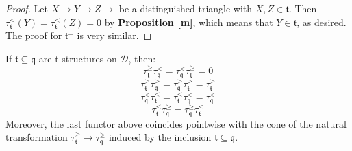 \begin{proof}
Let $X \longrightarrow Y \longrightarrow Z \longrightarrow$ be a distinguished triangle with $X,Z \in \mathfrak{t}$. Then $\tau^<_{\mathfrak{t}}(Y)=\tau^<_{\mathfrak{t}}(Z)=0$ by \hyperref[m]{\textbf{Proposition \ref*{m}}}, which means that $Y \in \mathfrak{t}$, as desired. The proof for $\mathfrak{t}^{\perp}$ is very similar. 
\end{proof}

\begin{prop}\label{l}
If $\mathfrak{t} \subseteq \mathfrak{q}$ are t-structures on $\mathscr{D}$, then: $$\tau^{\ge}_{\mathfrak{t}}\tau^<_{\mathfrak{q}}=\tau^<_{\mathfrak{q}}\tau^{\ge}_{\mathfrak{t}}=0$$ $$\tau^{\ge}_{\mathfrak{t}}\tau^{\ge}_{\mathfrak{q}}=\tau^{\ge}_{\mathfrak{q}}\tau^{\ge}_{\mathfrak{t}}=\tau^{\ge}_{\mathfrak{t}}$$ $$\tau^<_{\mathfrak{q}}\tau^<_{\mathfrak{t}}=\tau^<_{\mathfrak{t}}\tau^<_{\mathfrak{q}}=\tau^<_{\mathfrak{q}}$$ $$\tau^<_{\mathfrak{t}}\tau^{\ge}_{\mathfrak{q}}=\tau^{\ge}_{\mathfrak{q}}\tau^<_{\mathfrak{t}}$$
Moreover, the last functor above coincides pointwise with the cone of  the natural transformation $\tau^{\ge}_{\mathfrak{t}} \longrightarrow \tau^{\ge}_{\mathfrak{q}}$ induced by the inclusion $\mathfrak{t} \subseteq \mathfrak{q}$.
\end{prop}

